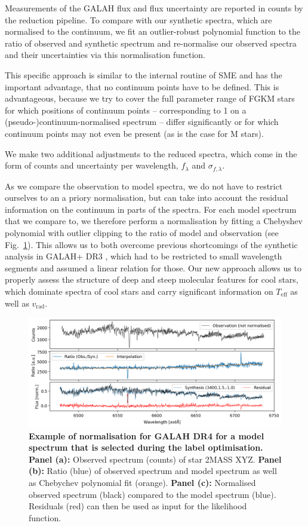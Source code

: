 \documentclass[
  journal=pasa,
  manuscript=research-paper, %
  year=2023,
  volume=37
]{cup-journal}
\newcommand{\Teff}{$T_\mathrm{eff}$\xspace}
\newcommand{\vrad}{$v_\mathrm{rad}$\xspace}
\begin{document}
Measurements of the GALAH flux and flux uncertainty are reported in counts by the reduction pipeline. To compare with our synthetic spectra, which are normalised to the continuum, we fit an outlier-robust polynomial function to the ratio of observed and synthetic spectrum and re-normalise our observed spectra and their uncertainties via this normalisation function.

This specific approach is similar to the internal routine of \textsc{SME} \citep{Piskunov2017} and has the important advantage, that no continuum points have to be defined. This is advantageous, because we try to cover the full parameter range of FGKM stars for which positions of continuum points -- corresponding to 1 on a (pseudo-)continuum-normalised spectrum -- differ significantly or for which continuum points may not even be present (as is the case for M stars).

 We make two additional adjustments to the reduced spectra, which come in the form of counts and uncertainty per wavelength, $f_\lambda$ and $\sigma_{f,\lambda}$.

 As we compare the observation to model spectra, we do not have to restrict ourselves to an a priory normalisation, but can take into account the residual information on the continuum in parts of the spectra. For each model spectrum that we compare to, we therefore perform a normalisation by fitting a Chebyshev polynomial with outlier clipping to the ratio of model and observation (see Fig.~\ref{fig:ratio_normalisation}). This allows us to both overcome previous shortcomings of the synthetic analysis in GALAH+ DR3 \citep{Buder2021}, which had to be restricted to small wavelength segments and assumed a linear relation for those. Our new approach allows us to properly assess the structure of deep and steep molecular features for cool stars, which dominate spectra of cool stars and carry significant information on \Teff as well as \vrad.

 \begin{figure}[hbt!]
  \centering
  \includegraphics[width=\textwidth]{figures/Nuisance_example.png}
  \caption{
  \textbf{Example of normalisation for GALAH DR4 for a model spectrum that is selected during the label optimisation.}
  \textbf{Panel (a):} Observed spectrum (counts) of star 2MASS XYZ.
  \textbf{Panel (b):} Ratio (blue) of observed spectrum and model spectrum as well as Chebychev polynomial fit (orange).
  \textbf{Panel (c):} Normalised observed spectrum (black) compared to the model spectrum (blue). Residuals (red) can then be used as input for the likelihood function.
  }
  \label{fig:ratio_normalisation}
 \end{figure}
\end{document}
